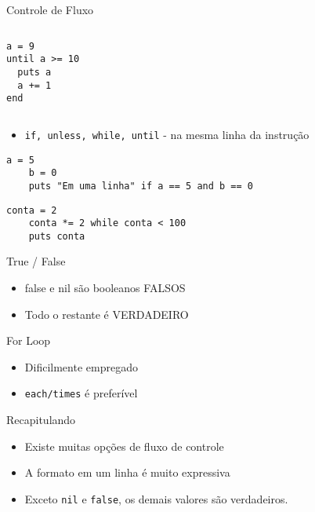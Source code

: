 \begin{frame}{Controle de Fluxo}
\begin{columns}
\begin{column}{0.5\textwidth}
      \begin{lstlisting}[style=RubyInputStyle, caption=until.rb]
    a = 9
until a >= 10 
  puts a                       
  a += 1                       
end 
      \end{lstlisting}
    \end{column}
  \end{columns}
\pagebreak
  \begin{itemize}
    \item \verb!if, unless, while, until! - na mesma linha da instrução
  \end{itemize}   
      \begin{lstlisting}[style=RubyInputStyle, caption=if\_uma\_linha.rb]
    a = 5
    b = 0
    puts "Em uma linha" if a == 5 and b == 0
      \end{lstlisting}  
      \begin{lstlisting}[style=RubyInputStyle, caption=while\_uma\_linha.rb]
    conta = 2 
    conta *= 2 while conta < 100
    puts conta
      \end{lstlisting}
\end{frame}

\begin{frame}[fragile,t]{True / False}
  \begin{itemize}
    \item false e nil são booleanos FALSOS
    \item Todo o restante é VERDADEIRO
	
  \end{itemize}   
\end{frame}

\begin{frame}{For Loop}
  \begin{itemize}
    \item Dificilmente empregado
    \item \verb!each/times! é preferível
  \end{itemize}
  
  

\end{frame}


\begin{frame}[fragile,t]{Recapitulando}
  \begin{itemize}
    \item Existe muitas opções de fluxo de controle
    \item A formato em um linha é muito expressiva
    \item Exceto \verb!nil! e \verb!false!, os demais valores são verdadeiros.
  \end{itemize}
\end{frame}




